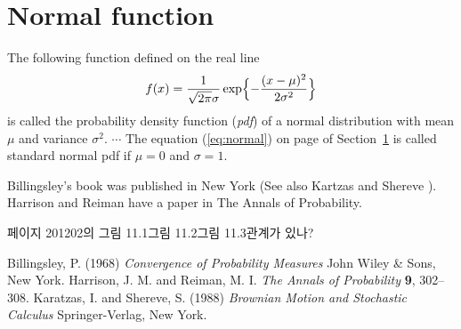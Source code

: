 \documentclass[11pt]{article}
\begin{document}
\section{Normal function} \label{ss:normal}
The following function defined on the real line
\begin{equation} \label{eq:normal}
f(x) = \frac{1}{\sqrt{2\pi}\sigma} \exp\Bigl\{-\frac{(x-\mu)^2}{2\sigma^2}\Bigr\}
\end{equation}
is called the probability density function (\emph{pdf}) of a normal distribution with mean $\mu$ and variance $\sigma^2$.
$\cdots$ The equation (\ref{eq:normal}) on page \pageref{eq:normal} of Section~\ref{ss:normal} is called standard normal pdf if $\mu=0$ and $\sigma=1$.

Billingsley's \cite[see Cahpter~5]{bill1} book was published in New York (See also Kartzas and Shereve \cite[Optional]{KandS}). Harrison and Reiman \cite{HandR} have a paper in The Annals of Probability.

페이지 201\와 202의 그림 11.1\과 그림 11.2\는 그림 11.3\와 관계가 있나?

\begin{thebibliography}{12345}
 Billingsley, P. (1968) \emph{Convergence of Probability Measures} John Wiley \& Sons, New York.
 Harrison, J. M. and Reiman, M. I. \emph{The Annals of Probability} \textbf{9}, 302--308.
 Karatzas, I. and Shereve, S. (1988) \emph{Brownian Motion and Stochastic Calculus} Springer-Verlag, New York.
\end{thebibliography}
 
 
\end{document}

